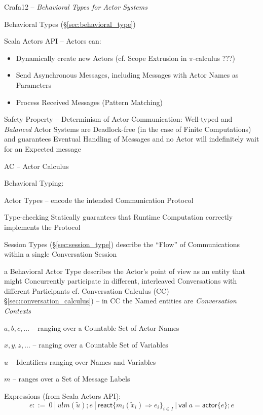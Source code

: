 \begingroup

\newcommand{\react}{\mathsf{react}}
\newcommand{\val}{\mathsf{val\;}}
\newcommand{\actor}{\mathsf{actor}}

Crafa12 -- \emph{Behavioral Types for Actor Systems}

Behavioral Types (\S\ref{sec:behavioral_type})

Scala Actors API -- Actors can:
\begin{itemize}
  \item Dynamically create new Actors (cf. Scope Extrusion in
    $\pi$-calculus ???)
  \item Send Asynchronous Messages, including Messages with Actor
    Names as Parameters
  \item Process Received Messages (Pattern Matching)
\end{itemize}

Safety Property -- Determinism of Actor Communication: Well-typed and
\emph{Balanced} Actor Systems are Deadlock-free (in the case of Finite
Computations) and guarantees Eventual Handling of Messages and no
Actor will indefinitely wait for an Expected message

AC -- Actor Calculus

Behavioral Typing:

Actor Types -- encode the intended Communication Protocol

Type-checking Statically guarantees that Runtime Computation correctly
implements the Protocol

Session Types (\S\ref{sec:session_type}) describe the ``Flow'' of
Communications within a single Conversation Session

a Behavioral Actor Type describes the Actor's point of view as an
entity that might Concurrently participate in different, interleaved
Conversations with different Participants \fist cf. Conversation
Calculus (CC) \S\ref{sec:conversation_calculus}) -- in CC the Named
entities are \emph{Conversation Contexts}

$a,b,c,\ldots$ -- ranging over a Countable Set of Actor Names

$x,y,z,\ldots$ -- ranging over a Countable Set of Variables

$u$ -- Identifiers ranging over Names and Variables

$m$ -- ranges over a Set of Message Labels

Expressions (from Scala Actors API):
\[
  e ::=\ 0 \ |\ u!m(\tilde{u});e
    \ |\ \react \{ m_i(\tilde{x}_i) \Rightarrow e_i \}_{i \in I}
    \ |\ \val a = \actor \{ e \};e
\]

